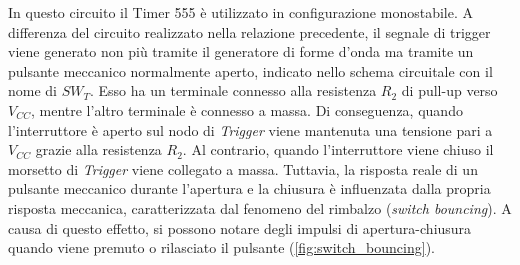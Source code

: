 \noindent
In questo circuito il Timer 555 è utilizzato in configurazione monostabile. A differenza del circuito realizzato nella relazione precedente, il segnale di trigger viene generato non più tramite il generatore di forme d'onda ma tramite un pulsante meccanico normalmente aperto, indicato nello schema circuitale con il nome di $SW_{T}$. 
Esso ha un terminale connesso alla resistenza $R_2$ di pull-up verso $V_{CC}$, mentre l'altro terminale è connesso a massa. Di conseguenza, quando l'interruttore è aperto sul nodo di \textit{Trigger} viene mantenuta una tensione pari a $V_{CC}$ grazie alla resistenza $R_2$. Al contrario, quando l'interruttore viene chiuso il morsetto di \textit{Trigger} viene collegato a massa. Tuttavia, la risposta reale di un pulsante meccanico durante l'apertura e la chiusura è influenzata dalla propria risposta meccanica, caratterizzata dal fenomeno del rimbalzo (\textit{switch bouncing}). A causa di questo effetto, si possono notare degli impulsi di apertura-chiusura quando viene premuto o rilasciato il pulsante (\Fig\ref{fig:switch_bouncing}).
